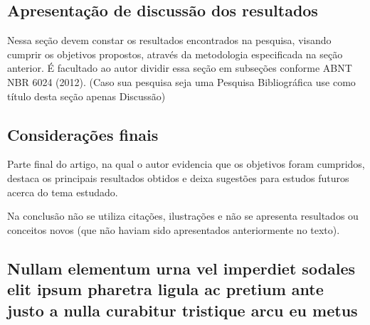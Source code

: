 \documentclass[
article,			%
11pt,				%
twoside,			%
a4paper,			%
section=TITLE,		%
onecolumn,          %
english,			%
brazil,				%
sumario=tradicional
]{abntex2}
\begin{document}
\section{Apresentação de discussão dos resultados}
Nessa seção devem constar os resultados encontrados na pesquisa, visando cumprir os objetivos propostos, através da metodologia especificada na seção anterior. É facultado ao autor dividir essa seção em subseções conforme ABNT NBR 6024 (2012). 
(Caso sua pesquisa seja uma Pesquisa Bibliográfica use como título desta seção apenas Discussão)



    
 \section{Considerações finais}
 Parte final do artigo, na qual o autor evidencia que os objetivos foram cumpridos, destaca os principais resultados obtidos e deixa sugestões para estudos futuros acerca do tema estudado.
 
Na conclusão não se utiliza citações, ilustrações e não se apresenta resultados ou conceitos novos (que não haviam sido apresentados anteriormente no texto).

    
        
    \postextual                 %
    
    
    
    
    \vspace{1cm}
    \begin{apendicesenv}
        
        \chapter{Nullam elementum urna vel imperdiet sodales elit ipsum pharetra ligula
            ac pretium ante justo a nulla curabitur tristique arcu eu metus}
        \lipsum[55-57]
        
    \end{apendicesenv}
    
\end{document}
